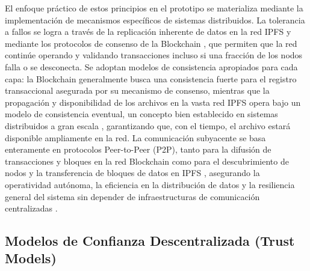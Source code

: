 \documentclass[
    letterpaper, 
    man,   
    spanish,
    12pt,
    donotrepeattitle,
    floatsintext,
    hidelinks %
]{apa7}
\begin{document}
El enfoque práctico de estos principios en el prototipo se materializa mediante la implementación de mecanismos específicos de sistemas distribuidos. La tolerancia a fallos se logra a través de la replicación inherente de datos en la red IPFS \parencite{benet2014ipfs} y mediante los protocolos de consenso de la Blockchain \parencite{nakamoto2008bitcoin,antonopoulos2023mastering}, que permiten que la red continúe operando y validando transacciones incluso si una fracción de los nodos falla o se desconecta. Se adoptan modelos de consistencia apropiados para cada capa: la Blockchain generalmente busca una consistencia fuerte para el registro transaccional asegurada por su mecanismo de consenso, mientras que la propagación y disponibilidad de los archivos en la vasta red IPFS opera bajo un modelo de consistencia eventual, un concepto bien establecido en sistemas distribuidos a gran escala \parencite{vogels2008eventually, vanSteen2017}, garantizando que, con el tiempo, el archivo estará disponible ampliamente en la red. La comunicación subyacente se basa enteramente en protocolos Peer-to-Peer (P2P), tanto para la difusión de transacciones y bloques en la red Blockchain \parencite{nakamoto2008bitcoin} como para el descubrimiento de nodos y la transferencia de bloques de datos en IPFS \parencite{benet2014ipfs}, asegurando la operatividad autónoma, la eficiencia en la distribución de datos y la resiliencia general del sistema sin depender de infraestructuras de comunicación centralizadas \parencite{coulouris2011}. 

  

\subsection{Modelos de Confianza Descentralizada (Trust Models)} 
\end{document}
